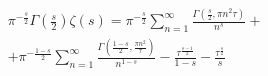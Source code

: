 \documentclass[10pt]{article}
\begin{document}
\[

\begin{aligned}

& \pi^{-\frac{s}{2}} \Gamma\left(\frac{s}{2}\right) \zeta(s)=\pi^{-\frac{s}{2}} \sum_{n=1}^{\infty} \frac{\Gamma\left(\frac{s}{2}, \pi n^{2} \tau\right)}{n^{s}}+ \\

& +\pi^{-\frac{1-s}{2}} \sum_{n=1}^{\infty} \frac{\Gamma\left(\frac{1-s}{2}, \frac{\pi n^{2}}{\tau}\right)}{n^{1-s}}-\frac{\tau^{\frac{s-1}{2}}}{1-s}-\frac{\tau^{\frac{s}{2}}}{s}

\end{aligned}

\]
\end{document}
